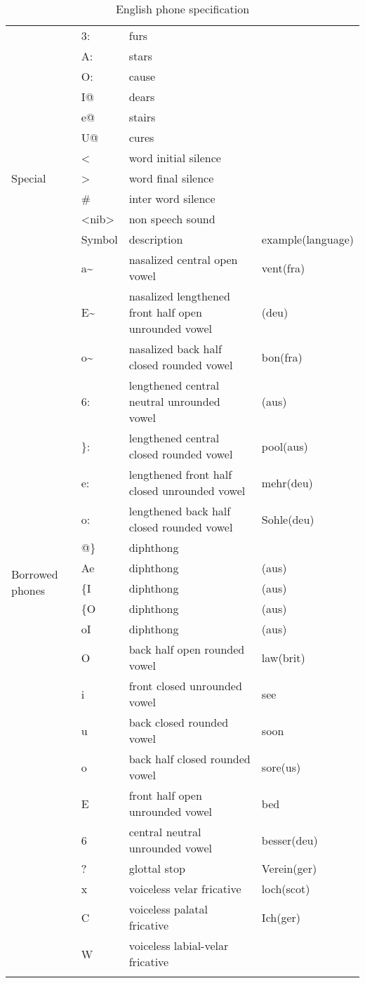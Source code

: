 {\begin{longtable}{l|l|p{.3\linewidth}|l}
	& 3: & furs &\\
	& A: & stars &\\
	& O: & cause &\\
	& I@ & dears &\\
	& e@ & stairs &\\
	& U@ & cures &\\
	\hline
	\multirow{3}{*}{Special} &
	\textless & word initial silence & \\
	& \textgreater & word final silence & \\
	& \# & inter word silence & \\
	& \textless nib\textgreater & non speech sound & \\
	\hline\hline
	\multirow{22}{*}{Borrowed phones} & Symbol & description &
		example(language)\\
	\hline
	& a\textasciitilde & 
		nasalized central open vowel & vent(fra)\\
	& E\textasciitilde & 
		nasalized lengthened front half open unrounded vowel & (deu)\\
	& o\textasciitilde & 
		nasalized back half closed rounded vowel & bon(fra)\\
	& 6: & lengthened central neutral unrounded vowel & (aus)\\
	& \}: & lengthened central closed rounded vowel & pool(aus)\\
	& e: & lengthened front half closed unrounded vowel & mehr(deu)\\
	& o: & lengthened back half closed rounded vowel & Sohle(deu)\\
	& @\} & diphthong &\\
	& Ae & diphthong & (aus)\\
	& \{I & diphthong & (aus)\\
	& \{O & diphthong & (aus)\\
	& oI & diphthong & (aus)\\
	& O & back half open rounded vowel & law(brit)\\
	& i & front closed unrounded vowel & see\\
	& u & back closed rounded vowel & soon\\
	& o & back half closed rounded vowel & sore(us)\\
	& E & front half open unrounded vowel & bed\\
	& 6 & central neutral unrounded vowel & besser(deu)\\
	& ? & glottal stop & Verein(ger)\\
	& x & voiceless velar fricative & loch(scot)\\
	& C & voiceless palatal fricative & Ich(ger)\\
	& W & voiceless labial-velar fricative &\\
	\hline
	\caption{English phone specification}
\end{longtable}
}

